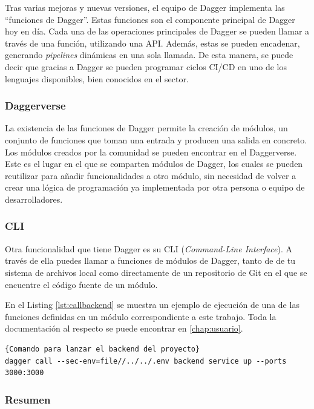 Tras varias mejoras y nuevas versiones, el equipo de Dagger implementa las ``funciones de Dagger''. Estas funciones son el componente principal de Dagger hoy en día. Cada una de las operaciones principales de Dagger se pueden llamar a través de una función, utilizando una API. Además, estas se pueden encadenar, generando \textit{pipelines} dinámicas en una sola llamada. De esta manera, se puede decir  que gracias a Dagger se pueden programar ciclos CI/CD en uno de los lenguajes disponibles, bien conocidos en el sector.

\subsubsection*{Daggerverse}

La existencia de las funciones de Dagger permite la creación de módulos, un conjunto de funciones que toman una entrada y producen una salida en concreto. Los módulos creados por la comunidad se pueden encontrar en el Daggerverse\cite{daggerverse}. Este es el lugar en el que se comparten módulos de Dagger, los cuales se pueden reutilizar para añadir funcionalidades a otro módulo, sin necesidad de volver a crear una lógica de programación ya implementada por otra persona o equipo de desarrolladores.

\subsubsection*{CLI}

Otra funcionalidad que tiene Dagger es su CLI\cite{cli} (\textit{Command-Line Interface}). A través de ella puedes llamar a funciones de módulos de Dagger, tanto de de tu sistema de archivos local como directamente de un repositorio de Git en el que se encuentre el código fuente de un módulo.

En el Listing \ref{lst:callbackend} se muestra un ejemplo de ejecución de una de las funciones definidas en un módulo correspondiente a este trabajo. Toda la documentación al respecto se puede encontrar en \ref{chap:usuario}.

\begin{lstlisting}[label=lst:callbackend]{Comando para lanzar el backend del proyecto}
dagger call --sec-env=file//../../.env backend service up --ports 3000:3000
\end{lstlisting}

\subsubsection*{Resumen}


